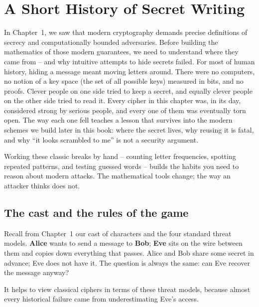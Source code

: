 \chapter{A Short History of Secret Writing}

In Chapter~1, we saw that modern cryptography demands precise definitions of secrecy and computationally bounded adversaries. Before building the mathematics of those modern guarantees, we need to understand where they came from -- and why intuitive attempts to hide secrets failed. For most of human history, hiding a message meant moving letters around. There were no
computers, no notion of a key space (the set of all possible keys) measured in bits, and no proofs. Clever
people on one side tried to keep a secret, and equally clever people on the other side
tried to read it. Every cipher in this
chapter was, in its day, considered strong by serious people, and every one of them was
eventually torn open. The way each one fell teaches a lesson that survives into the modern
schemes we build later in this book: where the secret lives, why reusing it is fatal,
and why ``it looks scrambled to me'' is not a security argument.

Working these classic breaks by hand -- counting letter frequencies, spotting repeated
patterns, and testing guessed words -- builds the habits you need to reason about modern
attacks. The mathematical tools change; the way an attacker thinks does not.

\chapterline

\section{The cast and the rules of the game}
\label{ch02:cast}

Recall from Chapter~1 our cast of characters and the four standard threat models. \textbf{Alice} wants to send a message to \textbf{Bob}; \textbf{Eve} sits on the wire between them and copies down everything that passes. Alice and Bob share some secret in advance; Eve does not have it. The question is always the same: can Eve recover the message anyway?

It helps to view classical ciphers in terms of these threat models, because almost every historical failure came from underestimating Eve's access.

